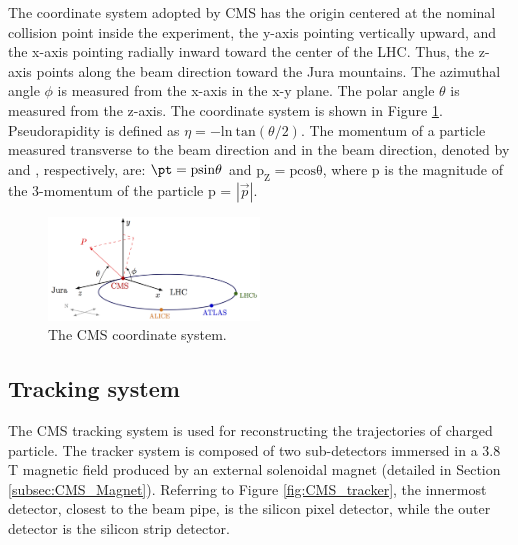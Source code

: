 The coordinate system adopted by CMS has the origin centered at the nominal collision point inside the experiment, the y-axis pointing vertically upward, and the x-axis pointing radially inward toward the center of the LHC. Thus, the z-axis points along the beam direction toward the Jura mountains. The azimuthal angle $\phi$ is measured from the
x-axis in the x-y plane. The polar angle $\theta$ is measured from the z-axis. The coordinate system is shown in Figure \ref{fig:CMS_coordinate}. Pseudorapidity is defined as $\eta=-\mathrm{ln~tan}(\theta/2)$. The momentum of a particle measured transverse to the beam direction and in the beam direction, denoted by \pt and \pZ, respectively, are: $\mathrm{\pt=psin\theta}$ and $\mathrm{p_{Z}=pcos\theta}$, where p is the magnitude of the 3-momentum of the particle p = $|\overrightarrow{p}|$.

\begin{figure}[h!]
\begin{center}
\includegraphics[width=0.5\textwidth]{figures/CMS/cms_coordinate_system.png}
\caption{The CMS coordinate system.}
\label{fig:CMS_coordinate}
\end{center}
\end{figure}
\subsection{Tracking system}\label{subsec:CMS_tracker}


The CMS tracking system is used for reconstructing the trajectories of charged particle. The tracker system is composed of two sub-detectors immersed in a 3.8 T magnetic field produced by an external solenoidal magnet (detailed in Section \ref{subsec:CMS_Magnet}). Referring to Figure \ref{fig:CMS_tracker}, the innermost detector, closest to the beam pipe, is the silicon pixel detector, while the outer detector is the silicon strip detector.

